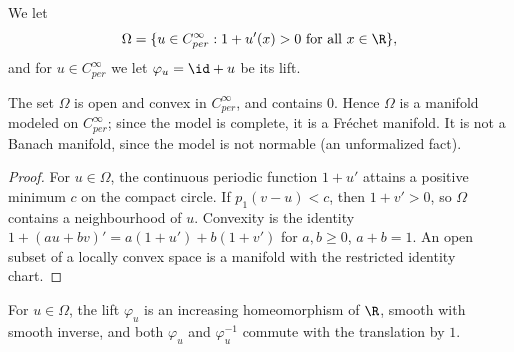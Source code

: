 \begin{definition}
  \label{def:ex-omega}
  \leanok
  We let
  \[
    \Omega = \{u \in C^\infty_{per} : 1 + u'(x) > 0 \text{ for all } x \in \R\},
  \]
  and for $u \in C^\infty_{per}$ we let $\varphi_u = \id + u$ be its lift.
\end{definition}

\begin{proposition}
  \label{prop:ex-omega-open}
  \leanok
  The set $\Omega$ is open and convex in $C^\infty_{per}$, and contains $0$. Hence $\Omega$ is a
  manifold modeled on $C^\infty_{per}$; since the model is complete, it is a Fréchet manifold.
  It is not a Banach manifold, since the model is not normable (an unformalized fact).
\end{proposition}

\begin{proof}
  \leanok
  For $u \in \Omega$, the continuous periodic function $1 + u'$ attains a positive minimum $c$ on
  the compact circle. If $p_1(v - u) < c$, then $1 + v' > 0$, so $\Omega$ contains a
  neighbourhood of $u$. Convexity is the identity
  $1 + (au + bv)' = a(1 + u') + b(1 + v')$ for $a, b \ge 0$, $a + b = 1$. An open subset of a
  locally convex space is a manifold with the restricted identity chart.
\end{proof}

\begin{proposition}
  \label{prop:ex-lift-diffeo}
  \leanok
  For $u \in \Omega$, the lift $\varphi_u$ is an increasing homeomorphism of $\R$, smooth with
  smooth inverse, and both $\varphi_u$ and $\varphi_u^{-1}$ commute with the translation by $1$.
\end{proposition}

